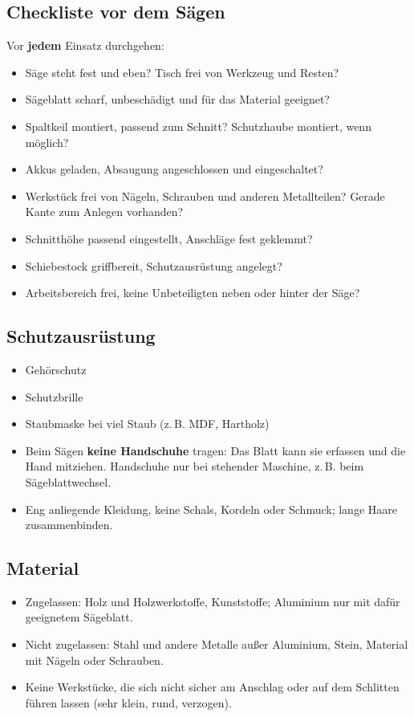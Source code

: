 \documentclass{\basedir/fablab-document}
\begin{document}
	\subsection{Checkliste vor dem Sägen}
	Vor \textbf{jedem} Einsatz durchgehen:
	\begin{itemize}
		\item Säge steht fest und eben? Tisch frei von Werkzeug und Resten?
		\item Sägeblatt scharf, unbeschädigt und für das Material geeignet?
		\item Spaltkeil montiert, passend zum Schnitt? Schutzhaube montiert, wenn möglich?
		\item Akkus geladen, Absaugung angeschlossen und eingeschaltet?
		\item Werkstück frei von Nägeln, Schrauben und anderen Metallteilen? Gerade Kante zum Anlegen vorhanden?
		\item Schnitthöhe passend eingestellt, Anschläge fest geklemmt?
		\item Schiebestock griffbereit, Schutzausrüstung angelegt?
		\item Arbeitsbereich frei, keine Unbeteiligten neben oder hinter der Säge?
	\end{itemize}

	\subsection{Schutzausrüstung}
	\begin{itemize}
		\item Gehörschutz
		\item Schutzbrille
		\item Staubmaske bei viel Staub (z.\,B. MDF, Hartholz)
		\item Beim Sägen \textbf{keine Handschuhe} tragen: Das Blatt kann sie erfassen und die Hand mitziehen. Handschuhe nur bei stehender Maschine, z.\,B. beim Sägeblattwechsel.
		\item Eng anliegende Kleidung, keine Schals, Kordeln oder Schmuck; lange Haare zusammenbinden.
	\end{itemize}

	\subsection{Material}
	\begin{itemize}
		\item Zugelassen: Holz und Holzwerkstoffe, Kunststoffe; Aluminium nur mit dafür geeignetem Sägeblatt.
		\item Nicht zugelassen: Stahl und andere Metalle außer Aluminium, Stein, Material mit Nägeln oder Schrauben.
		\item Keine Werkstücke, die sich nicht sicher am Anschlag oder auf dem Schlitten führen lassen (sehr klein, rund, verzogen).
	\end{itemize}
\end{document}
